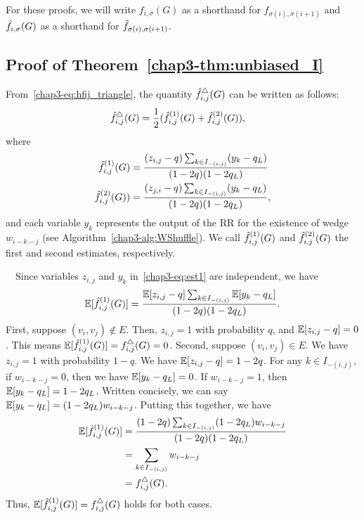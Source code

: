 For these proofs, we will write $f_{i,\sigma}(G)$ as a shorthand for
$f_{\sigma(i), \sigma(i+1)}$ and $\hat{f}_{i,\sigma}(G)$ as a shorthand for
$\hat{f}_{\sigma(i), \sigma(i+1)}$.

\subsection{Proof of Theorem~\ref{chap3-thm:unbiased_I}}
\label{chap3-sub:unbiased_I_proof}
    From~\eqref{chap3-eq:hfij_triangle}, the quantity $\hat{f}_{i,j}^\triangle(G)$ can be written as follows:
    \begin{align}
        \hat{f}_{i,j}^\triangle(G)
        &= \frac{1}{2} (\hat{f}_{i,j}^{(1)}(G) + \hat{f}_{i,j}^{(2)}(G)),
        \label{chap3-eq:est_decomp}
    \end{align}
    where
    \begin{align}
        \hat{f}_{i,j}^{(1)}(G)
        &= \frac{(z_{i,j}-q)\sum_{k \in I_{-(i,j)}} (y_{k} - q_L)}{(1-2q)(1-2q_L)} \label{chap3-eq:est1}\\
        \hat{f}_{i,j}^{(2)}(G))
        &= \frac{(z_{j,i}-q)\sum_{k \in I_{-(i,j)}} (y_{k} - q_L)}{(1-2q)(1-2q_L)}, \label{chap3-eq:est2}
    \end{align}
    and each variable $y_k$ represents the output of the RR for the existence of wedge $w_{i-k-j}$ (see Algorithm~\ref{chap3-alg:WShuffle}).
    We call $\hat{f}_{i,j}^{(1)}(G)$ and $\hat{f}_{i,j}^{(2)}(G)$ the first and second estimates, respectively.

    \smallskip
    ~~Since variables $z_{i,j}$ and $y_{k}$ in~\eqref{chap3-eq:est1} are independent, we have
    \begin{equation*}
        \operatorname{\mathbb{E}}[\hat{f}_{i,j}^{(1)}(G)] = \frac{\operatorname{\mathbb{E}}[z_{i,j}-q]\sum_{k \in I_{-(i,j)}}
        \operatorname{\mathbb{E}}[y_{k} - q_L]}{(1-2q)(1-2q_L)}.
    \end{equation*}
    First, suppose $(v_i,v_j) \notin E$. Then, $z_{i,j} = 1$ with probability $q$, and $\operatorname{\mathbb{E}}[z_{i,j} - q] = 0$. This means $\operatorname{\mathbb{E}}[\hat{f}_{i,j}^{(1)}(G)] = f_{i,j}^\triangle(G) = 0$.
    Second, suppose $(v_i,v_j) \in E$. We have $z_{i,j}=1$ with probability $1-q$.
    We have $\operatorname{\mathbb{E}}[z_{i,j} - q] = 1-2q$. For any $k \in I_{-(i,j)}$, if
    $w_{i-k-j} = 0$, then we have $\operatorname{\mathbb{E}}[y_{k} - q_L] = 0$. If
    $w_{i-k-j} = 1$, then $\operatorname{\mathbb{E}}[y_{k}-q_L] = 1-2q_L$. Written concisely, we
    can say $\operatorname{\mathbb{E}}[y_{k}-q_L] = (1-2q_L)w_{i-k-j}$. Putting this together, we have
    \begin{align*}
        \operatorname{\mathbb{E}}[\hat{f}_{i,j}^{(1)}(G)] &= \frac{(1-2q)\sum_{k \in
        I_{-(i,j)}}(1-2q_L)w_{i-k-j}}{(1-2q)(1-2q_L)} \\
        &= \sum_{k \in I_{-(i,j)}} w_{i-k-j} \\
        &= f_{i,j}^\triangle(G).
    \end{align*}
    Thus, $\operatorname{\mathbb{E}}[\hat{f}_{i,j}^{(1)}(G)] = f_{i,j}^\triangle(G)$ holds for both cases.

